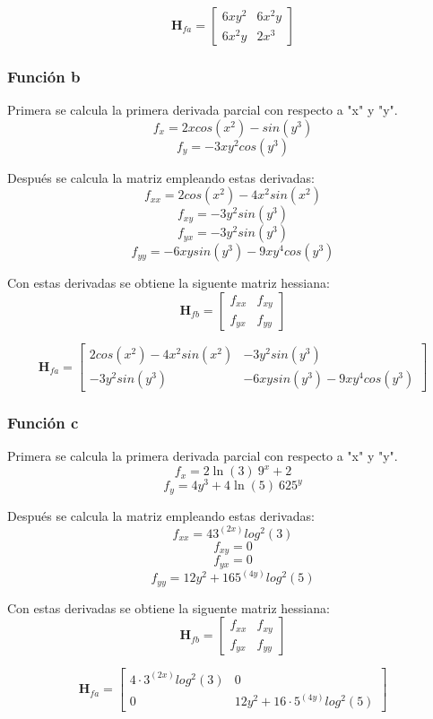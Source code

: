 \documentclass[12 pt]{article}
\begin{document}
\[
\mathbf H_{fa}= \begin{bmatrix}
  6 x y^2 & 6 x^2 y \\
  6 x^2 y & 2 x^3
\end{bmatrix}
\]

\subsubsection{Función b}
Primera se calcula la primera derivada parcial con respecto a "x" y "y".
\[
    f_x = 2xcos(x^2) - sin(y^3)
\]
\[
    f_y = -3xy^2cos(y^3)
\]

Después se calcula la matriz empleando estas derivadas:
\[
f_{xx} = 2 cos(x^2) - 4 x^2 sin(x^2) 
\]
\[
f_{xy} = -3 y^2 sin(y^3)
\]
\[
f_{yx} = -3 y^2 sin(y^3)
\]
\[
f_{yy} =  -6 x y sin(y^3) - 9 x y^4 cos(y^3)
\]

Con estas derivadas se obtiene la siguente matriz hessiana:
\[
\mathbf H_{fb}= \begin{bmatrix}
  f_{xx} & f_{xy} \\
  f_{yx} & f_{yy}
\end{bmatrix}
\]

\[
\mathbf H_{fa}= \begin{bmatrix}
  2 cos(x^2) - 4 x^2 sin(x^2)  & -3 y^2 sin(y^3) \\
  -3 y^2 sin(y^3) & -6 x y sin(y^3) - 9 x y^4 cos(y^3)
\end{bmatrix}
\]

\subsubsection{Función c}
Primera se calcula la primera derivada parcial con respecto a "x" y "y".
\[
    f_x = 2\ln \left(3\right) \:9^x+2
\]
\[
    f_y = 4y^3+4\ln \left(5\right) \:625^y
\]

Después se calcula la matriz empleando estas derivadas:
\[
f_{xx} = 4 3^(2 x) log^2(3)
\]
\[
f_{xy} = 0
\]
\[
f_{yx} = 0
\]
\[
f_{yy} =  12 y^2 + 16 5^(4 y) log^2(5)
\]

Con estas derivadas se obtiene la siguente matriz hessiana:
\[
\mathbf H_{fb}= \begin{bmatrix}
  f_{xx} & f_{xy} \\
  f_{yx} & f_{yy}
\end{bmatrix}
\]

\[
\mathbf H_{fa}= \begin{bmatrix}
 4 \cdot 3^{(2x)} log^2(3)  & 0 \\
  0 & 12 y^2 + 16\cdot5^{(4 y)} log^2(5)
\end{bmatrix}
\]
\end{document}
